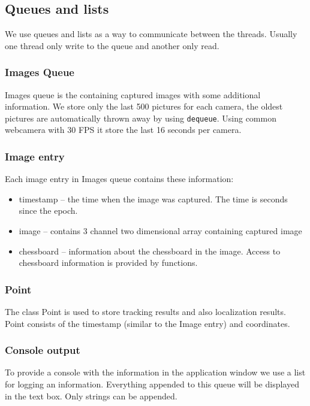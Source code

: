 \subsection{Queues and lists}

We use queues and lists as a way to communicate between the threads. Usually
one thread only write to the queue and another only read.

\subsubsection{Images Queue}

Images queue is the containing captured images with some additional
information. We store only the last 500 pictures for each camera, the oldest
pictures are automatically thrown away by using \verb+dequeue+. Using common
webcamera with 30 FPS it store the last 16 seconds per camera.

\subsubsection*{Image entry}

Each image entry in Images queue contains these information:
\begin{itemize}
\item timestamp -- the time when the image was captured. The time is seconds since the epoch.
\item image -- contains 3 channel two dimensional array containing captured image
\item chessboard -- information about the chessboard in the image. Access to
chessboard information is provided by functions.
\end{itemize}

\subsubsection{Point}

The class Point is used to store tracking results and also localization
results.  Point consists of the timestamp (similar to the Image entry) and
coordinates.

\subsubsection{Console output}

To provide a console with the information in the application window we use a
list for logging an information. Everything appended to this queue will be
displayed in the text box. Only strings can be appended.

